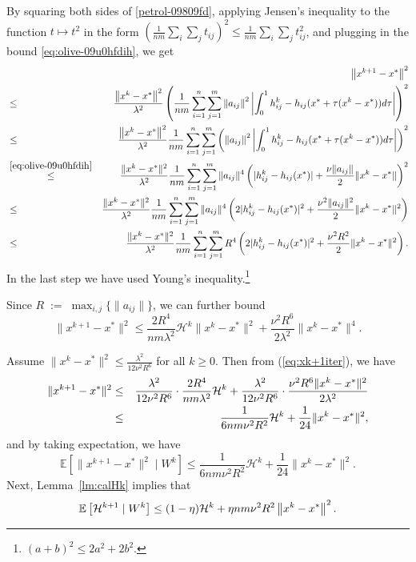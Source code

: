 \documentclass[12pt]{article}
\newcommand{\eqdef}{\; { := }\;}
\newcommand{\ExpBr}[1]{\mathbb{E}\left[#1\right]}
\newcommand{\norm}[1]{\left\|#1\right\|}
\newcommand{\cH}{{\mathcal{H}}}
\begin{document}
\noindent By squaring both sides of \eqref{petrol-09809fd},  applying Jensen's inequality to the function $t\mapsto t^2$ in the form $\left(\frac{1}{nm}\sum_i \sum_j t_{ij}\right)^2 \leq \frac{1}{nm}\sum_i \sum_j t^2_{ij}$, and plugging in the bound \eqref{eq:olive-09u0hfdih}, we get
\begin{eqnarray*}	
&&\norm{ x^{k+1} - x^* }^2\\
&\leq&  \frac{ \norm{x^k - x^*}^2}{ \lambda^2} \left(\frac{1}{nm} \sum_{i=1}^n \sum_{j=1}^{m} \norm{a_{ij}}^2 \left|   \int_{0}^1 h_{ij}^k - h_{ij}(x^* + \tau(x^k - x^*))  d\tau  \right| \right)^2 \\
&\leq &\frac{ \norm{x^k - x^*}^2}{ \lambda^2} \frac{1}{nm} \sum_{i=1}^n \sum_{j=1}^{m} \left( \norm{a_{ij}}^2  \left| \int_{0}^1 h_{ij}^k - h_{ij}(x^* + \tau(x^k - x^*))  d\tau  \right|\right)^2 \\
&\overset{\eqref{eq:olive-09u0hfdih}}{\leq}&  \frac{\|x^k-x^*\|^2}{ \lambda^2} \frac{1}{nm}\sum_{i=1}^n \sum_{j=1}^{m} \|a_{ij}\|^4 \left(   |h_{ij}^k - h_{ij}(x^*)| + \frac{\nu \|a_{ij}\|}{2} \|x^k-x^*\|  \right)^2 \\ 
&\leq&  \frac{\|x^k-x^*\|^2}{ \lambda^2} \frac{1}{nm}\sum_{i=1}^n \sum_{j=1}^{m} \|a_{ij}\|^4 \left(   2|h_{ij}^k - h_{ij}(x^*)|^2 + \frac{\nu^2 \|a_{ij}\|^2}{2} \|x^k-x^*\|^2  \right) \\
&\leq & \frac{\|x^k-x^*\|^2}{ \lambda^2} \frac{1}{nm}\sum_{i=1}^n \sum_{j=1}^{m} R^4 \left(   2|h_{ij}^k - h_{ij}(x^*)|^2 + \frac{\nu^2 R^2}{2} \|x^k-x^*\|^2  \right).
\end{eqnarray*}
In the last step we have used Young's inequality.\footnote{$(a+b)^2 \leq 2a^2 + 2b^2$.}


\noindent Since $R\eqdef \max_{i, j} \{ \|a_{ij}\| \}$, we can further bound
\begin{equation}\label{eq:xk+1iter}
\|x^{k+1} - x^*\|^2 \leq \frac{2 R^4}{nm\lambda^2}  \cH^k \|x^k-x^*\|^2 + \frac{ \nu^2 R^6}{2\lambda^2}\|x^k-x^*\|^4. 
\end{equation}


\noindent Assume $\|x^k - x^*\|^2 \leq \frac{\lambda^2}{12\nu^2R^6}$ for all $k\geq 0$. Then from (\ref{eq:xk+1iter}), we have 
\begin{eqnarray*}
	\|x^{k+1} - x^*\|^2 &\leq& \frac{\lambda^2}{12\nu^2 R^6} \cdot \frac{2R^4}{nm\lambda^2} \cH^k + \frac{\lambda^2}{12\nu^2 R^6} \cdot \frac{ \nu^2 R^6\|x^k-x^*\|^2}{2\lambda^2} \\ 
	&\leq& \frac{1}{6nm \nu^2 R^2} {\cal H}^k + \frac{1}{24} \|x^k - x^*\|^2, 
\end{eqnarray*}
and by taking expectation, we have 
\begin{equation}\label{eq:expxk+1}
\ExpBr{ \|x^{k+1} - x^*\|^2 \;|\; W^k } \leq  \frac{1}{6nm \nu^2 R^2}  \cH^k + \frac{1}{24} \|x^k - x^*\|^2. 
\end{equation}
Next, Lemma~\ref{lm:calHk} implies that
\begin{equation}\label{eq:oklah090pop}
\ExpBr{ {\cal H}^{k+1} \;|\; W^k} \leq  (1-\eta) {\cal H}^k +  \eta nm \nu^2 R^2 \norm{x^k - x^*}^2.
\end{equation}
\end{document}

